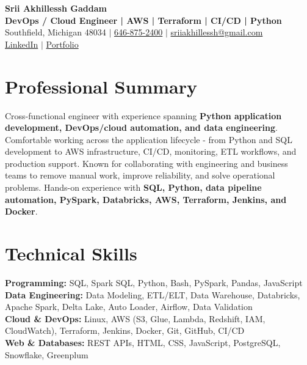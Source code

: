 \documentclass[letterpaper,10pt]{article}
\begin{document}
\fontsize{9.35pt}{10.45pt}\selectfont

\begin{center}
    {\LARGE \textbf{Srii Akhillessh Gaddam}} \\[-1pt]
    \textbf{DevOps / Cloud Engineer | AWS | Terraform | CI/CD | Python} \\[2pt]
    Southfield, Michigan 48034 $|$
    \href{tel:6468752400}{646-875-2400} $|$
    \href{mailto:sriiakhillessh@gmail.com}{sriiakhillessh@gmail.com} \\[1pt]
    \href{https://www.linkedin.com/in/srii-akhiilessh-gaddam-b48668191/}{LinkedIn} $|$
    \href{https://sriiakhillesshg.github.io/portfolio/}{Portfolio}
\end{center}
\vspace{-8pt}

\section{Professional Summary}
\small{Cross-functional engineer with experience spanning \textbf{Python application development, DevOps/cloud automation, and data engineering}. Comfortable working across the application lifecycle - from Python and SQL development to AWS infrastructure, CI/CD, monitoring, ETL workflows, and production support. Known for collaborating with engineering and business teams to remove manual work, improve reliability, and solve operational problems. Hands-on experience with \textbf{SQL, Python, data pipeline automation, PySpark, Databricks, AWS, Terraform, Jenkins, and Docker}.}

\section{Technical Skills}
\small{
\textbf{Programming:} SQL, Spark SQL, Python, Bash, PySpark, Pandas, JavaScript \\
\textbf{Data Engineering:} Data Modeling, ETL/ELT, Data Warehouse, Databricks, Apache Spark, Delta Lake, Auto Loader, Airflow, Data Validation \\
\textbf{Cloud \& DevOps:} Linux, AWS (S3, Glue, Lambda, Redshift, IAM, CloudWatch), Terraform, Jenkins, Docker, Git, GitHub, CI/CD \\
\textbf{Web \& Databases:} REST APIs, HTML, CSS, JavaScript, PostgreSQL, Snowflake, Greenplum
}
\end{document}
